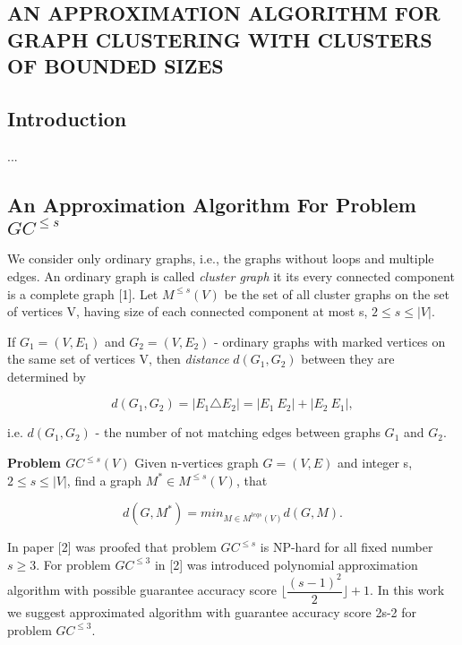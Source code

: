 \documentclass[12pt]{article}
\begin{document}
\begin{center}
	\section*{AN APPROXIMATION ALGORITHM FOR GRAPH CLUSTERING WITH CLUSTERS OF BOUNDED SIZES}
	\subsection*{Introduction}
\end{center}

...

	\subsection*{An Approximation Algorithm For Problem $GC^{ \leq s} $}


We consider only ordinary graphs, i.e., the graphs without loops and multiple edges. An ordinary graph is called \textit{cluster graph} it its every connected component is a complete graph [1].
Let $M^{\leq s}(V)$ be the set of all cluster graphs on the set of vertices V, having size of each connected component at most s, $ 2 \leq s \leq |V|$.

If $G_1 = (V,E_1)$ and $G_2 = (V, E_2)$ - ordinary graphs with marked vertices on the same set of vertices V, then \textit{distance} $d(G_1,G_2)$ between they are determined by

$$
d(G_1,G_2) = |E_1\triangle E_2| = |E_1 \ E_2| + |E_2\ E_1|,
$$

i.e. $d(G_1,G_2)$ - the number of not matching edges between graphs $G_1$ and $G_2$.

\textbf{Problem $GC^{\leq s}(V)$} Given n-vertices  graph $G = (V,E)$ and integer s,  $2 \leq s \leq |V|$, find a graph $M^* \in M^{\leq s}(V)$, that

$$
d(G,M^*)= min_{M\in M^{leq s}(V)}d(G,M).
$$

In paper [2] was proofed that problem $GC^{\leq s}$ is NP-hard for all fixed number $s \geq 3$. For problem $GC^{\leq 3}$ in [2] was introduced polynomial approximation algorithm  with possible guarantee accuracy score
$ \lfloor \dfrac{(s-1)^2}{2} \rfloor + 1$. In this work we suggest approximated algorithm with guarantee accuracy score 2s-2 for problem $GC^{\leq 3}$. %
\end{document}
